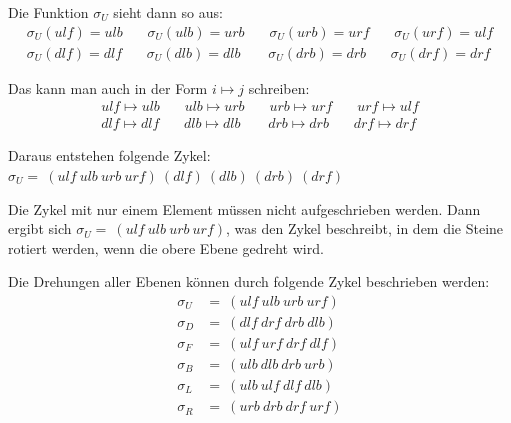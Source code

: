 \documentclass[12pt,a4paper, usenames, dvipsnames]{article}
\theoremstyle{mystyle}
\theoremstyle{definition}
\begin{document}
Die Funktion $\sigma_U$ sieht dann so aus:
\begin{align*}
\sigma_U(ulf)=ulb \ \ \ \ \ \ \ \ \sigma_U(ulb)=urb \ \ \ \ \ \ \ \ \sigma_U(urb)=urf \ \ \ \ \ \ \ \ \sigma_U(urf)=ulf \\
\sigma_U(dlf)=dlf \ \ \ \ \ \ \ \ \sigma_U(dlb)=dlb \ \ \ \ \ \ \ \ \ \sigma_U(drb)=drb \ \ \ \ \ \ \ \ \sigma_U(drf)=drf 
\end{align*}

Das kann man auch in der Form $i \mapsto j$ schreiben: 
\begin{align*}
ulf \mapsto ulb \ \ \ \ \ \ \ \ ulb \mapsto urb \ \ \ \ \ \ \ \ urb \mapsto urf \ \ \ \ \ \ \ \ urf \mapsto ulf \\
dlf \mapsto dlf \ \ \ \ \ \ \ \ dlb \mapsto dlb \ \ \ \ \ \ \ \ \ drb \mapsto drb \ \ \ \ \ \ \ \ drf \mapsto drf 
\end{align*}

Daraus entstehen folgende Zykel: $\sigma_U = \ (ulf \ ulb \ urb \ urf)\ (dlf)\ (dlb)\ (drb)\ (drf)$

Die Zykel mit nur einem Element müssen nicht aufgeschrieben werden. Dann ergibt sich $\sigma_U = \ (ulf \ ulb \ urb \ urf)$, was den Zykel beschreibt, in dem die Steine rotiert werden, wenn die obere Ebene gedreht wird. 


Die Drehungen aller Ebenen können durch folgende Zykel beschrieben werden: 
\begin{align*}
\sigma_U & =\ (ulf \ ulb \ urb \ urf) \\
\sigma_D & =\ (dlf \ drf \ drb \ dlb) \\
\sigma_F & =\ (ulf \ urf \ drf \ dlf) \\
\sigma_B & =\ (ulb \ dlb \ drb \ urb) \\
\sigma_L & =\ (ulb \ ulf \ dlf \ dlb) \\
\sigma_R & =\ (urb \ drb \ drf \ urf) \\
\end{align*}

%
%
%
%
%
%
%
%
%
%
%
%
%
%
%
%
%
%
%
%
\end{document}
